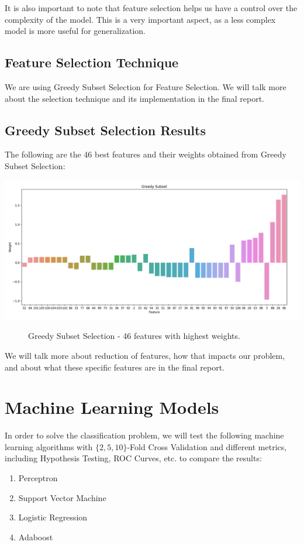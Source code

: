 \documentclass[fleqn]{article}
\begin{document}
    It is also important to note that feature selection helps us have a control over the
    complexity of the model. This is a very important aspect, as a less complex model
    is more useful for generalization.

    \subsection{Feature Selection Technique}
    We are using Greedy Subset Selection for Feature Selection. We will talk more about
    the selection technique and its implementation in the final report.

    \subsection{Greedy Subset Selection Results}
    The following are the 46 best features and their weights obtained from Greedy Subset
    Selection:

    \begin{center}
        \includegraphics[scale=0.27]{46.png}
        \begin{figure}[!h]
            \caption{Greedy Subset Selection - 46 features with highest weights.}
        \end{figure}
    \end{center}


    We will talk more about reduction of features, how that impacts our problem,
    and about what these specific features are in the final report.

    \section{Machine Learning Models}

    In order to solve the classification problem,
    we will test the following machine learning algorithms with $ \{2, 5, 10\} $-Fold Cross
    Validation and different metrics, including Hypothesis Testing, ROC Curves, etc.
    to compare the results:
    \begin{enumerate}
        \item Perceptron
        \item Support Vector Machine
        \item Logistic Regression
        \item Adaboost
    \end{enumerate}
\end{document}
